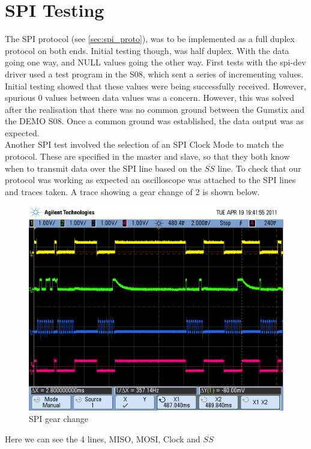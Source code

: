 \documentclass[11pt]{report} %
\begin{document}
	\section{SPI Testing}
		The SPI protocol (see \ref{sec:spi_proto}), was to be implemented as a full duplex 
		protocol on both ends. Initial testing though, was half duplex. With the data
		going one way, and NULL values going the other way.
		First tests with the spi-dev driver used a test program in the S08, which sent
		a series of incrementing values. Initial testing showed that these values were
		being successfully received. However, spurious 0 values between data values was
		a concern. However, this was solved after the realisation that there was no
		common ground between the Gumstix and the DEMO S08. Once a common ground was 
		established, the data output was as expected.\\
		Another SPI test involved the selection of an SPI Clock Mode to match the
		protocol. These are specified in the master and slave, so that they both
		know when to transmit data over the SPI line based on the $\overline{SS}$
		line.
		To check that our protocol was working as expected an oscilloscope was attached
		to the SPI lines and traces taken.
		A trace showing a gear change of 2 is shown below.
		\begin{figure}[H]
		\centering
		\includegraphics[scale=0.25]{images/GearChange2.png}
		\caption{SPI gear change}\label{fig:program architecture}
		\end{figure}
		Here we can see the 4 lines, MISO, MOSI, Clock and $\overline{SS}$ 
\end{document}
